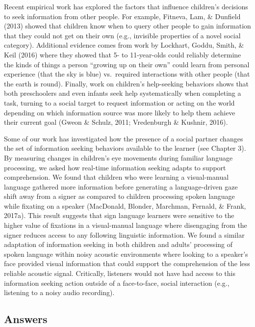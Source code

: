 \documentclass[oneside]{report}
\begin{document}
Recent empirical work has explored the factors that influence children's
decisions to seek information from other people. For example, Fitneva,
Lam, \& Dunfield (2013) showed that children know when to query other
people to gain information that they could not get on their own (e.g.,
invisible properties of a novel social category). Additional evidence
comes from work by Lockhart, Goddu, Smith, \& Keil (2016) where they
showed that 5- to 11-year-olds could reliably determine the kinds of
things a person ``growing up on their own'' could learn from personal
experience (that the sky is blue) vs.~required interactions with other
people (that the earth is round). Finally, work on children's
help-seeking behaviors shows that both preschoolers and even infants
seek help systematically when completing a task, turning to a social
target to request information or acting on the world depending on which
information source was more likely to help them achieve their current
goal (Gweon \& Schulz, 2011; Vredenburgh \& Kushnir, 2016).

Some of our work has investigated how the presence of a social partner
changes the set of information seeking behaviors available to the
learner (see Chapter 3). By measuring changes in children's eye
movements during familiar language processing, we asked how real-time
information seeking adapts to support comprehension. We found that
children who were learning a visual-manual language gathered more
information before generating a language-driven gaze shift away from a
signer as compared to children processing spoken language while fixating
on a speaker (MacDonald, Blonder, Marchman, Fernald, \& Frank, 2017a).
This result suggests that sign language learners were sensitive to the
higher value of fixations in a visual-manual language where disengaging
from the signer reduces access to any following linguistic information.
We found a similar adaptation of information seeking in both children
and adults' processing of spoken language within noisy acoustic
environments where looking to a speaker's face provided visual
information that could support the comprehension of the less reliable
acoustic signal. Critically, listeners would not have had access to this
information seeking action outside of a face-to-face, social interaction
(e.g., listening to a noisy audio recording).

\subsection{Answers}\label{answers}
\end{document}
